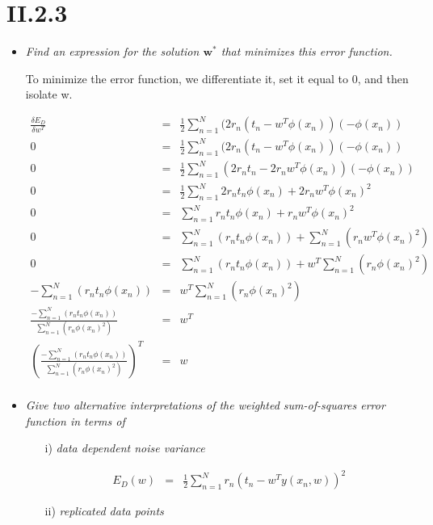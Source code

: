 \documentclass[12pt, a4paper]{article}
\begin{document}
\section{II.2.3}
\begin{itemize}
\item \textit{Find an expression for the solution $\textbf{w}^*$ that minimizes this error function.}

To minimize the error function, we differentiate it, set it equal to 0, and then isolate w.

\begin{eqnarray}
	\frac{\delta E_D}{\delta w^T} &=& \frac{1}{2}\sum^N_{n=1}(2r_n(t_n - w^T \phi (x_n))(-\phi (x_n))\\
	0 &=& \frac{1}{2}\sum^N_{n=1}(2r_n(t_n - w^T \phi (x_n))(-\phi (x_n))\\
	0 &=& \frac{1}{2}\sum^N_{n=1}(2r_nt_n - 2r_nw^T \phi (x_n))(-\phi (x_n))\\
	0 &=& \frac{1}{2}\sum^N_{n=1}2r_nt_n\phi (x_n) + 2r_nw^T \phi (x_n)^2\\	
	0 &=& \sum^N_{n=1}r_nt_n\phi (x_n) + r_nw^T \phi (x_n)^2\\
	0 &=& \sum^N_{n=1}(r_nt_n\phi (x_n)) + \sum^N_{n=1}(r_nw^T \phi (x_n)^2)\\
	0 &=& \sum^N_{n=1}(r_nt_n\phi (x_n)) + w^T\sum^N_{n=1}(r_n \phi (x_n)^2)\\
	-\sum^N_{n=1}(r_nt_n\phi (x_n)) &=& w^T\sum^N_{n=1}(r_n \phi (x_n)^2)\\
	\frac{-\sum^N_{n=1}(r_nt_n\phi (x_n))}{\sum^N_{n=1}(r_n \phi (x_n)^2)} &=& w^T\\
	\left(\frac{-\sum^N_{n=1}(r_nt_n\phi (x_n))}{\sum^N_{n=1}(r_n \phi (x_n)^2)}\right)^T &=& w\\
\end{eqnarray}


\item \textit{Give two alternative interpretations of the weighted sum-of-squares
error function in terms of}
\begin{itemize}
\item[i)] \textit{data dependent noise variance}

\begin{eqnarray}
	E_D(w) &=& \frac{1}{2}\sum^N_{n=1} r_n(t_n - w^Ty(x_n, w))^2
\end{eqnarray}

\item[ii)] \textit{replicated data points}
\end{itemize}
\end{itemize}
\end{document}
